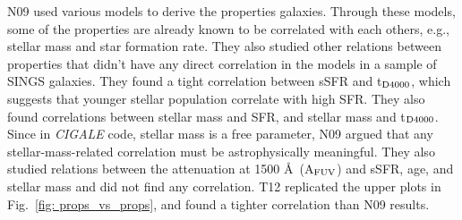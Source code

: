         N09 used various models to derive the properties galaxies.
        Through these models, some of the properties are already known to be correlated with each others, e.g., stellar mass and star formation rate.
        They also studied other relations between properties that didn't have any direct correlation in the models in a sample of SINGS galaxies. %
        They found a tight correlation between sSFR and t$_{\rm {D4000}}$, which suggests that younger stellar population correlate with high SFR.
        They also found correlations between stellar mass and SFR, and stellar mass and t$_{\rm {D4000}}$.
        Since in {\em CIGALE} code, stellar mass is a free parameter, N09 argued that any stellar-mass-related correlation must be astrophysically meaningful. 
        They also studied relations between the attenuation at 1500 \AA~(A$_{\rm {FUV}}$) and sSFR, age, and stellar mass and did not find any correlation.
        T12 replicated the upper plots in Fig.~\ref{fig: props_vs_props}, and found a tighter correlation than N09 results. 
        
